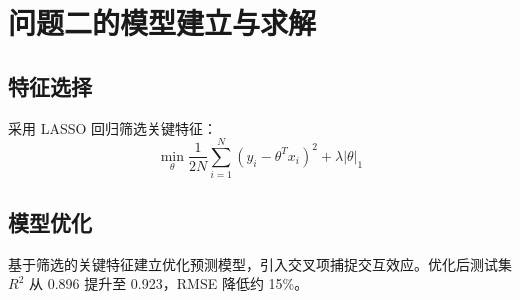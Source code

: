 \section{问题二的模型建立与求解}

\subsection{特征选择}

采用 LASSO 回归筛选关键特征：
\begin{equation}
\min_{\theta} \frac{1}{2N} \sum_{i=1}^{N} (y_i - \theta^T x_i)^2 + \lambda |\theta|_1
  \label{eq:6-problem2-1}
\end{equation}

\subsection{模型优化}

基于筛选的关键特征建立优化预测模型，引入交叉项捕捉交互效应。优化后测试集 $R^2$ 从 0.896 提升至 0.923，RMSE 降低约 15\%。
